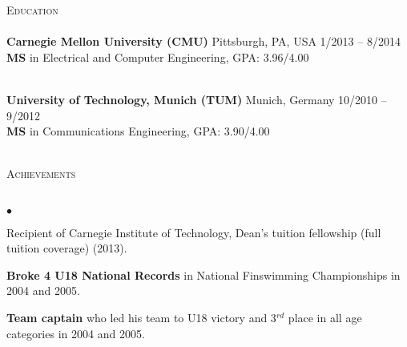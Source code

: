 \documentclass[11pt]{article}
\newcommand{\lineunder}{\vspace*{-8pt} \\ \hspace*{-18pt} \hrulefill \\}
\newcommand{\header}[1]{{\hspace*{-15pt}\vspace*{6pt} \textsc{#1}} \vspace*{-6pt} \lineunder}
\newcommand{\contact}[3]{
\vspace*{-8pt}
\begin{center}
{\LARGE \scshape {#1}}\\ \vspace*{4pt}
#2 \lineunder 
#3
\end{center}
\vspace*{-8pt}
}
\newenvironment{achievements}{\begin{list}{$\bullet$}{\topsep 0pt \itemsep -2pt}}{\vspace*{4pt}\end{list}}
\newcommand{\school}[5]{
  \textbf{#1} #2 \hfill  #5 \\ #3, #4
\vspace*{5pt}
}
\providecommand*\emaillink[1]{\nolinkurl{#1}}
\providecommand*\email[1]{\href{mailto:#1}{\emaillink{#1}}}
\begin{document}
\header{Education}
\school
{Carnegie Mellon University (CMU)}
{Pittsburgh, PA, USA}
{\textbf{MS} in Electrical and Computer Engineering}
{GPA: 3.96/4.00
}{1/2013 -- 8/2014}
{ 
}\\
\school
{University of Technology, Munich (TUM)}
{Munich, Germany}
{\textbf{MS} in Communications Engineering}
{GPA: 3.90/4.00}{10/2010 -- 9/2012}
{
}\\ 


\header{Achievements}
\begin{achievements}
\item Recipient of Carnegie Institute of Technology, Dean's tuition fellowship (full tuition coverage) (2013).
\item \textbf{Broke 4 U18 National Records} in National Finswimming Championships in 2004 and 2005.
\item \textbf{Team captain} who led his team to U18 victory and 3$^{rd}$ place in all age categories in 2004 and 2005.
\end{achievements}





\end{document}
